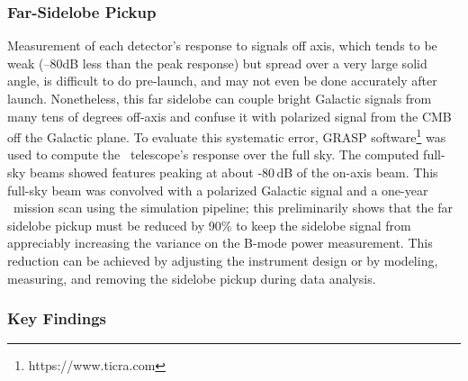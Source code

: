 \documentclass[PICOReport.tex]{subfiles}
\begin{document}
\subsubsection{Far-Sidelobe Pickup}
\label{sec:fsl}
Measurement of each detector's response to signals off axis, which tends to be weak (--80dB less than the peak response) but spread over a very large solid angle, is difficult to do pre-launch, and may not even be done accurately after launch.  Nonetheless, this far sidelobe can couple bright Galactic signals from many tens of degrees off-axis and confuse it with polarized signal from the CMB off the Galactic plane.    To evaluate this systematic error, GRASP software\footnote{https://www.ticra.com} was used to compute the \pico\ telescope's response over the full sky.  The computed full-sky beams showed features peaking at about -80\,dB of the on-axis beam.   
This full-sky beam was convolved with a polarized Galactic signal and a one-year \pico\ mission scan using the simulation pipeline; this preliminarily shows that the far sidelobe pickup must be reduced by 90\%  to keep the sidelobe signal from appreciably increasing the variance on the B-mode power measurement.
This reduction can be achieved by adjusting the instrument design or by modeling, measuring, and removing the sidelobe pickup during data analysis.

\subsubsection{Key Findings}
\label{sec:systematics_key}
\end{document}
